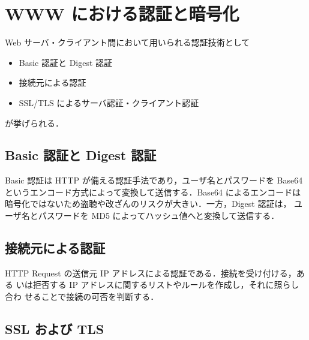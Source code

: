 \section{WWW における認証と暗号化}

Web サーバ・クライアント間において用いられる認証技術として
\begin{itemize}
\item Basic 認証と Digest 認証
\item 接続元による認証
\item SSL/TLS によるサーバ認証・クライアント認証
\end{itemize}
が挙げられる．

\subsection{Basic 認証と Digest 認証}
Basic 認証は HTTP が備える認証手法であり，ユーザ名とパスワードを Base64 
というエンコード方式によって変換して送信する．Base64 によるエンコードは
暗号化ではないため盗聴や改ざんのリスクが大きい．一方，Digest 認証は，
ユーザ名とパスワードを MD5 によってハッシュ値へと変換して送信する．

\subsection{接続元による認証}
HTTP Request の送信元 IP アドレスによる認証である．接続を受け付ける，ある
いは拒否する IP アドレスに関するリストやルールを作成し，それに照らし合わ
せることで接続の可否を判断する．

\subsection{SSL および TLS}

